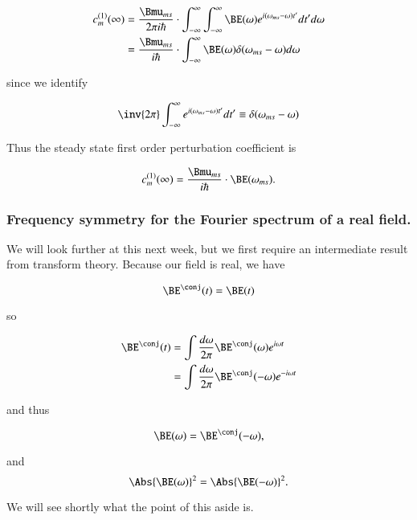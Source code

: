\begin{align*}
c_m^{(1)}(\infty)
&=
\frac{\Bmu_{ms}}{2 \pi i \hbar} \cdot
\int_{-\infty}^\infty
\int_{-\infty}^\infty
\BE(\omega)
e^{i (\omega_{ms} -\omega) t'} dt' d\omega \\
&=
\frac{\Bmu_{ms}}{i \hbar} \cdot
\int_{-\infty}^\infty
\BE(\omega)
\delta(\omega_{ms} - \omega)
d\omega
\end{align*}

since we identify

\begin{equation}\label{eqn:qmTwoL7:570}
\inv{2 \pi}
\int_{-\infty}^\infty
e^{i (\omega_{ms} -\omega) t'} dt' \equiv \delta(\omega_{ms} - \omega)
\end{equation}

Thus the steady state first order perturbation coefficient is

\begin{equation}\label{eqn:qmTwoL7:590}
c_m^{(1)}(\infty)
=
\frac{\Bmu_{ms}}{i \hbar} \cdot
\BE(\omega_{ms}).
\end{equation}

\subsubsection{Frequency symmetry for the Fourier spectrum of a real field.}

We will look further at this next week, but we first require an intermediate result from transform theory.  Because our field is real, we have

\begin{equation}\label{eqn:qmTwoL7:610}
\BE^\conj(t) = \BE(t)
\end{equation}

so

\begin{align*}
\BE^\conj(t)
&= \int \frac{d\omega}{2 \pi} \BE^\conj(\omega) e^{i \omega t} \\
&= \int \frac{d\omega}{2 \pi} \BE^\conj(-\omega) e^{-i \omega t} \\
\end{align*}

and thus

\begin{equation}\label{eqn:qmTwoL7:630}
\BE(\omega) = \BE^\conj(-\omega),
\end{equation}

and
\begin{equation}\label{eqn:qmTwoL7:650}
\Abs{\BE(\omega)}^2 = \Abs{\BE(-\omega)}^2.
\end{equation}

We will see shortly what the point of this aside is.

\EndArticle
